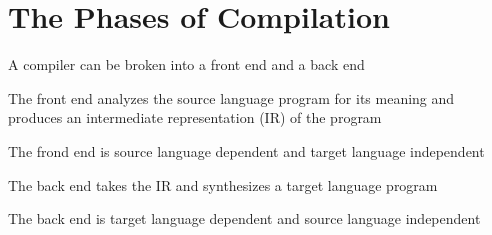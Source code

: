 \documentclass[8pt,a4paper,compress]{beamer}
\begin{document}
\section{The Phases of Compilation}
\begin{frame}[fragile]
\pause\transdissolve

A compiler can be broken into a front end and a back end

\begin{center}
\end{center}

\pause\transdissolve\bigskip

The front end analyzes the source language program for its meaning and produces an intermediate representation (IR) of the program

\pause\transdissolve\bigskip

The frond end is source language dependent and target language independent

\pause\transdissolve\bigskip

The back end takes the IR and synthesizes a target language program

\pause\transdissolve\bigskip

The back end is target language dependent and source language independent
\end{frame}
\end{document}

